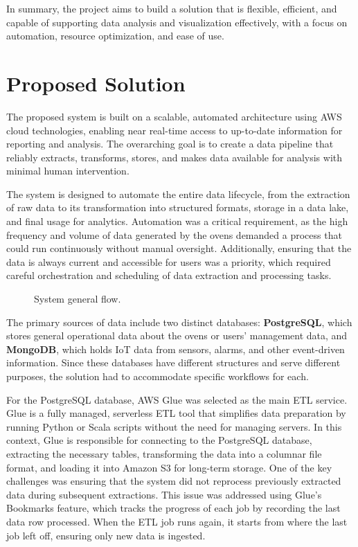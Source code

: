 In summary, the project aims to build a solution that is flexible, efficient, and capable of supporting data analysis and visualization effectively, with a focus on automation, resource optimization, and ease of use.
\section{Proposed Solution}
The proposed system is built on a scalable, automated architecture using \ac{AWS} cloud technologies, enabling near real-time access to up-to-date information for reporting and analysis. The overarching goal is to create a data pipeline that reliably extracts, transforms, stores, and makes data available for analysis with minimal human intervention.

The system is designed to automate the entire data lifecycle, from the extraction of raw data to its transformation into structured formats, storage in a data lake, and final usage for analytics. Automation was a critical requirement, as the high frequency and volume of data generated by the ovens demanded a process that could run continuously without manual oversight. Additionally, ensuring that the data is always current and accessible for users was a priority, which required careful orchestration and scheduling of data extraction and processing tasks.

\begin{figure}[H]
    \centering
    
    \caption{System general flow.}
\end{figure}

The primary sources of data include two distinct databases: \textbf{PostgreSQL}, which stores general operational data about the ovens or users' management data, and \textbf{MongoDB}, which holds \ac{IoT} data from sensors, alarms, and other event-driven information. Since these databases have different structures and serve different purposes, the solution had to accommodate specific workflows for each.

For the PostgreSQL database, \ac{AWS} Glue was selected as the main \ac{ETL} service. Glue is a fully managed, serverless \ac{ETL} tool that simplifies data preparation by running Python or Scala scripts without the need for managing servers. In this context, Glue is responsible for connecting to the PostgreSQL database, extracting the necessary tables, transforming the data into a columnar file format, and loading it into Amazon S3 for long-term storage. One of the key challenges was ensuring that the system did not reprocess previously extracted data during subsequent extractions. This issue was addressed using Glue's Bookmarks feature, which tracks the progress of each job by recording the last data row processed. When the \ac{ETL} job runs again, it starts from where the last job left off, ensuring only new data is ingested.

